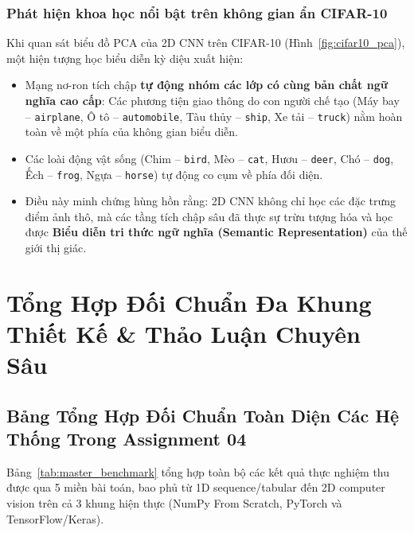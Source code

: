 \documentclass[12pt,a4paper]{report}
\begin{document}
\subsection{Phát hiện khoa học nổi bật trên không gian ẩn CIFAR-10}
Khi quan sát biểu đồ PCA của 2D CNN trên CIFAR-10 (Hình~\ref{fig:cifar10_pca}), một hiện tượng học biểu diễn kỳ diệu xuất hiện:
\begin{itemize}
    \item Mạng nơ-ron tích chập \textbf{tự động nhóm các lớp có cùng bản chất ngữ nghĩa cao cấp}: Các phương tiện giao thông do con người chế tạo (Máy bay -- \texttt{airplane}, Ô tô -- \texttt{automobile}, Tàu thủy -- \texttt{ship}, Xe tải -- \texttt{truck}) nằm hoàn toàn về một phía của không gian biểu diễn.
    \item Các loài động vật sống (Chim -- \texttt{bird}, Mèo -- \texttt{cat}, Hươu -- \texttt{deer}, Chó -- \texttt{dog}, Ếch -- \texttt{frog}, Ngựa -- \texttt{horse}) tự động co cụm về phía đối diện.
    \item Điều này minh chứng hùng hồn rằng: 2D CNN không chỉ học các đặc trưng điểm ảnh thô, mà các tầng tích chập sâu đã thực sự trừu tượng hóa và học được \textbf{Biểu diễn tri thức ngữ nghĩa (Semantic Representation)} của thế giới thị giác.
\end{itemize}


\chapter{Tổng Hợp Đối Chuẩn Đa Khung Thiết Kế \& Thảo Luận Chuyên Sâu}

\section{Bảng Tổng Hợp Đối Chuẩn Toàn Diện Các Hệ Thống Trong Assignment 04}
Bảng~\ref{tab:master_benchmark} tổng hợp toàn bộ các kết quả thực nghiệm thu được qua 5 miền bài toán, bao phủ từ 1D sequence/tabular đến 2D computer vision trên cả 3 khung hiện thực (NumPy From Scratch, PyTorch và TensorFlow/Keras).
\end{document}
